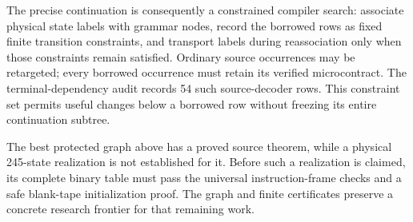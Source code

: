 The precise continuation is consequently a constrained compiler search:
associate physical state labels with grammar nodes, record the borrowed
rows as fixed finite transition constraints, and transport labels during
reassociation only when those constraints remain satisfied.  Ordinary
source occurrences may be retargeted; every borrowed occurrence must
retain its verified microcontract.  The terminal-dependency audit records
54 such source-decoder rows.  This constraint set permits useful
changes below a borrowed row without freezing its entire continuation
subtree.

The best protected graph above has a proved source theorem, while a
physical 245-state realization is not established for it.  Before such
a realization is claimed, its complete binary table must pass the
universal instruction-frame checks and a safe blank-tape initialization
proof.  The graph and finite certificates preserve a concrete research
frontier for that remaining work.
